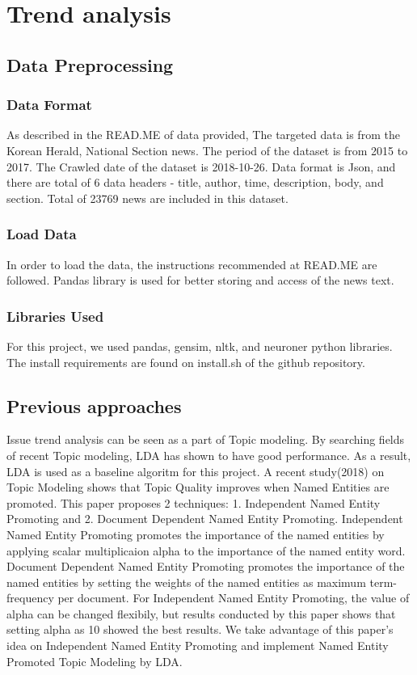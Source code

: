 \section{Trend analysis}

\subsection{Data Preprocessing}
\subsubsection{Data Format}
As described in the READ.ME of data provided, The targeted data is from the Korean Herald, National Section news. The period of the dataset is from 2015 to 2017. The Crawled date of the dataset is 2018-10-26. Data format is Json, and there are total of 6 data headers - title, author, time, description, body, and section. Total of 23769 news are included in this dataset.

\subsubsection{Load Data}
In order to load the data, the instructions recommended at READ.ME are followed. Pandas library is used for better storing and access of the news text.
\subsubsection{Libraries Used}
For this project, we used pandas, gensim, nltk, and neuroner python libraries. The install requirements are found on install.sh of the github repository.


\subsection{Previous approaches}
Issue trend analysis can be seen as a part of Topic modeling. By searching fields of recent Topic modeling, LDA has shown to have good performance. As a result, LDA is used as a baseline algoritm for this project.
A recent study(2018) on Topic Modeling shows that Topic Quality improves when Named Entities are promoted.\cite{krasnashchok-jouili-2018-improving} This paper proposes 2 techniques: 1. Independent Named Entity Promoting and 2. Document Dependent Named Entity Promoting. Independent Named Entity Promoting promotes the importance of the named entities by applying scalar multiplicaion alpha to the importance of the named entity word. Document Dependent Named Entity Promoting promotes the importance of the named entities by setting the weights of the named entities as maximum term-frequency per document. For Independent Named Entity Promoting, the value of alpha can be changed flexibily, but results conducted by this paper shows that setting alpha as 10 showed the best results.
We take advantage of this paper's idea on Independent Named Entity Promoting and implement Named Entity Promoted Topic Modeling by LDA.
